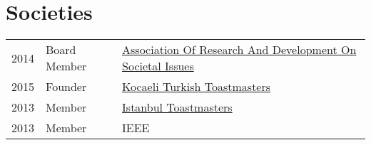 \documentclass[]{deedy-resume-openfont}
\begin{document}
\begin{minipage}[t]{0.66\textwidth}
\begin{tabular}{rll}
\end{tabular}
\sectionsep


\section{Societies} 

\begin{tabular}{rll}
2014 	& Board Member    & \href{http://kocaeliturkcetoastmasters.org/}{Association Of Research And Development On Societal Issues} \\
2015 	& Founder    & \href{http://kocaeliturkcetoastmasters.org/}{Kocaeli Turkish Toastmasters} \\
2013 	& Member    & \href{http://istanbultoastmasters.org/}{Istanbul Toastmasters} \\
2013 	& Member    & IEEE \\
\end{tabular}
\sectionsep

\end{minipage} 
\end{document}
